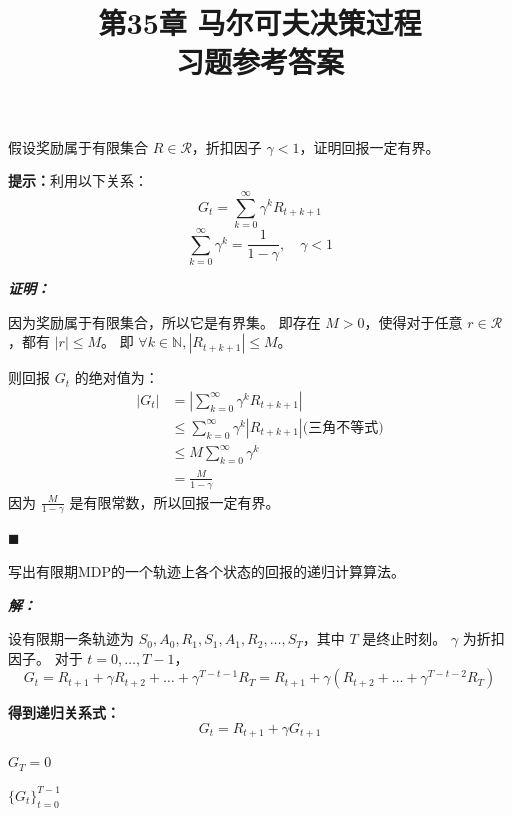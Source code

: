 \documentclass[12pt, a4paper]{article}
\title{\textbf{\huge 第35章 马尔可夫决策过程\\ \large 习题参考答案}}
\author{}
\date{}
\newenvironment{solution}{
	\par\vspace{0.2cm}\noindent\textbf{\color{themecolor} \textit{解：}}
}{
	\par\vspace{0.5cm} %
}
\renewenvironment{proof}{
	\par\vspace{0.2cm}\noindent\textbf{\color{themecolor} \textit{证明：}}
}{
	\hfill $\blacksquare$ \par\vspace{0.5cm} %
}
\begin{document}
	
	\maketitle
	\thispagestyle{empty}
	
	\begin{problem}[习题 35.1]
		假设奖励属于有限集合 $R \in \mathcal{R}$，折扣因子 $\gamma < 1$，证明回报一定有界。
		
		\small{\textbf{提示：}利用以下关系：
			\[ G_t = \sum_{k=0}^{\infty} \gamma^k R_{t+k+1} \]
			\[ \sum_{k=0}^{\infty} \gamma^k = \frac{1}{1-\gamma}, \quad \gamma < 1 \]
		}
	\end{problem}
	
	\begin{proof}
		因为奖励属于有限集合，所以它是有界集。
		即存在 $M > 0$，使得对于任意 $r \in \mathcal{R}$，都有 $|r| \le M$。
		即 $\forall k \in \mathbb{N}, |R_{t+k+1}| \le M$。
		
		则回报 $G_t$ 的绝对值为：
		\begin{align*}
			|G_t| &= \left| \sum_{k=0}^{\infty} \gamma^k R_{t+k+1} \right| \\
			&\le \sum_{k=0}^{\infty} \gamma^k |R_{t+k+1}|\text{(三角不等式)} \\
			&\le M \sum_{k=0}^{\infty} \gamma^k \\
			&= \frac{M}{1-\gamma}
		\end{align*}
		因为 $\frac{M}{1-\gamma}$ 是有限常数，所以回报一定有界。
	\end{proof}
	
	\clearpage
	\begin{problem}[习题 35.2]
		写出有限期MDP的一个轨迹上各个状态的回报的递归计算算法。
	\end{problem}
	
\begin{solution}
	设有限期一条轨迹为 $S_0, A_0, R_1, S_1, A_1, R_2, \dots, S_T$，其中 $T$ 是终止时刻。
	$\gamma$ 为折扣因子。
	对于 $t = 0, \dots, T-1$，
	\[ 
	G_t = R_{t+1} + \gamma R_{t+2} + \dots + \gamma^{T-t-1} R_T 
	= R_{t+1} + \gamma (R_{t+2} + \dots + \gamma^{T-t-2}R_T) 
	\]
	
	\textbf{得到递归关系式：}
	\[ G_t = R_{t+1} + \gamma G_{t+1} \]
	
	\vspace{1em}
	
	\begin{algorithm}[H]
		\renewcommand{\thealgocf}{} %
		\caption{计算回报的递归算法}
		
		$G_T = 0$\;
		
		\Return $\{G_t\}_{t=0}^{T-1}$\;
	\end{algorithm}
\end{solution}
	
\end{document}
